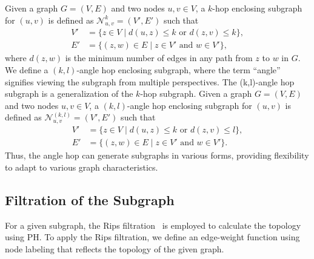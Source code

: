 Given a graph \( G = (V, E) \) and two nodes \( u,v \in V \), a \(k\)-hop enclosing subgraph for $(u,v)$ is defined as \( \mathcal{N}^k_{u,v} = (V', E') \) such that 
\begin{align*}
    V' &= \{ z \in V \mid d(u, z) \leq k \text{ or } d(z, v) \leq k\}, \\
    E' &= \{ (z, w) \in E \mid z \in V' \text{ and } w \in V' \},
\end{align*}
where $d(z, w)$ is the minimum number of edges in any path from $z$ to $w$ in $G$.
We define a \((k,l)\)-angle hop enclosing subgraph, where the term ``angle'' signifies viewing the subgraph from multiple perspectives. 
The (k,l)-angle hop subgraph is a generalization of the $k$-hop subgraph. 
Given a graph \( G = (V, E) \) and two nodes \( u, v \in V \), a \((k,l)\)-angle hop enclosing subgraph for \( (u, v) \) is defined as \( \mathcal{N}^{(k,l)}_{u,v} = (V', E') \) such that 
\begin{align*}
    V' &= \{ z \in V \mid d(u, z) \leq k \text{ or } d(z, v) \leq l \}, \\
    E' &= \{ (z, w) \in E \mid z \in V' \text{ and } w \in V' \}.
\end{align*}
Thus, the angle hop can generate subgraphs in various forms, providing flexibility to adapt to various graph characteristics.

\subsection{Filtration of the Subgraph}
\label{subsec:filtration}

For a given subgraph, the Rips filtration~\cite{vietoris1927hoheren, gromov1987hyperbolic, edelsbrunner2002topological} is employed to calculate the topology using PH. 
To apply the Rips filtration, we define an edge-weight function using node labeling that reflects the topology of the given graph. 

